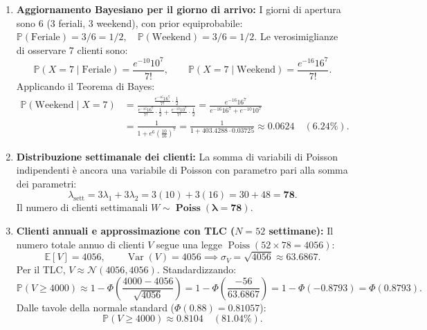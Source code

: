 \documentclass[11pt,a4paper]{article}
\newcommand{\EE}{\mathbb{E}}
\newcommand{\Prob}{\mathbb{P}}
\newcommand{\Var}{\operatorname{Var}}
\begin{document}
\begin{soluzionebox}
\begin{enumerate}[label=(\alph*)]
    \item \textbf{Aggiornamento Bayesiano per il giorno di arrivo:}
    I giorni di apertura sono 6 (3 feriali, 3 weekend), con prior equiprobabile: $\Prob(\text{Feriale}) = 3/6 = 1/2, \quad \Prob(\text{Weekend}) = 3/6 = 1/2$.
    Le verosimiglianze di osservare 7 clienti sono:
    \[
    \Prob(X=7 \mid \text{Feriale}) = \frac{e^{-10} 10^7}{7!}, \qquad \Prob(X=7 \mid \text{Weekend}) = \frac{e^{-16} 16^7}{7!}.
    \]
    Applicando il Teorema di Bayes:
    \begin{align*}
    \Prob(\text{Weekend} \mid X=7) &= \frac{\frac{e^{-16} 16^7}{7!} \cdot \frac{1}{2}}{\frac{e^{-16} 16^7}{7!} \cdot \frac{1}{2} + \frac{e^{-10} 10^7}{7!} \cdot \frac{1}{2}} = \frac{e^{-16} 16^7}{e^{-16} 16^7 + e^{-10} 10^7} \\
    &= \frac{1}{1 + e^6 \left(\frac{10}{16}\right)^7} = \frac{1}{1 + 403.4288 \cdot 0.03725} \approx \mathbf{0.0624} \quad (\mathbf{6.24\%}).
    \end{align*}

    \item \textbf{Distribuzione settimanale dei clienti:}
    La somma di variabili di Poisson indipendenti è ancora una variabile di Poisson con parametro pari alla somma dei parametri:
    \[
    \lambda_{\text{sett}} = 3 \lambda_1 + 3 \lambda_2 = 3(10) + 3(16) = 30 + 48 = \mathbf{78}.
    \]
    Il numero di clienti settimanali $W \sim \mathbf{\operatorname{Poiss}(\lambda = 78)}$.

    \item \textbf{Clienti annuali e approssimazione con TLC ($N = 52$ settimane):}
    Il numero totale annuo di clienti $V$ segue una legge $\operatorname{Poiss}(52 \times 78 = 4056)$:
    \[
    \EE[V] = 4056, \qquad \Var(V) = 4056 \implies \sigma_V = \sqrt{4056} \approx 63.6867.
    \]
    Per il TLC, $V \approx \mathcal{N}(4056, 4056)$. Standardizzando:
    \[
    \Prob(V \ge 4000) \approx 1 - \Phi\left(\frac{4000 - 4056}{\sqrt{4056}}\right) = 1 - \Phi\left(\frac{-56}{63.6867}\right) = 1 - \Phi(-0.8793) = \Phi(0.8793).
    \]
    Dalle tavole della normale standard ($\Phi(0.88) = 0.81057$):
    \[
    \Prob(V \ge 4000) \approx \mathbf{0.8104} \quad (\mathbf{81.04\%}).
    \]
\end{enumerate}
\end{soluzionebox}
\end{document}
